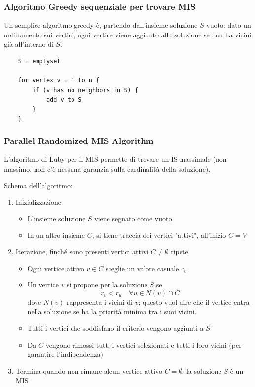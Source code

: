 \subsubsection{Algoritmo Greedy sequenziale per trovare MIS}

Un semplice algoritmo greedy è, partendo dall'insieme soluzione $S$ vuoto: dato un ordinamento sui vertici, ogni vertice viene aggiunto alla soluzione se non ha vicini già all'interno di $S$.

\begin{lstlisting}
    S = emptyset

    for vertex v = 1 to n {
        if (v has no neighbors in S) {
            add v to S
        }
    }
\end{lstlisting}

\subsubsection{Parallel Randomized MIS Algorithm}

L'algoritmo di Luby per il MIS permette di trovare un IS massimale (non massimo, non c'è nessuna garanzia sulla cardinalità della soluzione). 

Schema dell'algoritmo: 
\begin{enumerate}
    \item Inizializzazione 
    \begin{itemize}
        \item L'insieme soluzione $S$ viene segnato come vuoto
    
        \item In un altro insieme $C$, si tiene traccia dei vertici "attivi", all'inizio $C = V$
    \end{itemize}
    
    \item Iterazione, finché sono presenti vertici attivi $C \neq \emptyset$ ripete
    \begin{itemize}
        \item Ogni vertice attivo $v \in C$ sceglie un valore casuale $r_v$
        
        \item Un vertice $v$ si propone per la soluzione $S$ se 
        $$ r_v < r_u \quad \forall u \in N(v) \cap C $$
        dove $N(v)$ rappresenta i vicini di $v$; questo vuol dire che il vertice entra nella soluzione se ha la priorità minima tra i suoi vicini.
        
        \item Tutti i vertici che soddisfano il criterio vengono aggiunti a $S$
        
        \item Da $C$ vengono rimossi tutti i vertici selezionati e tutti i loro vicini (per garantire l'indipendenza)
    \end{itemize}
    
    \item Termina quando non rimane alcun vertice attivo $C = \emptyset$: la soluzione $S$ è un MIS
\end{enumerate}

